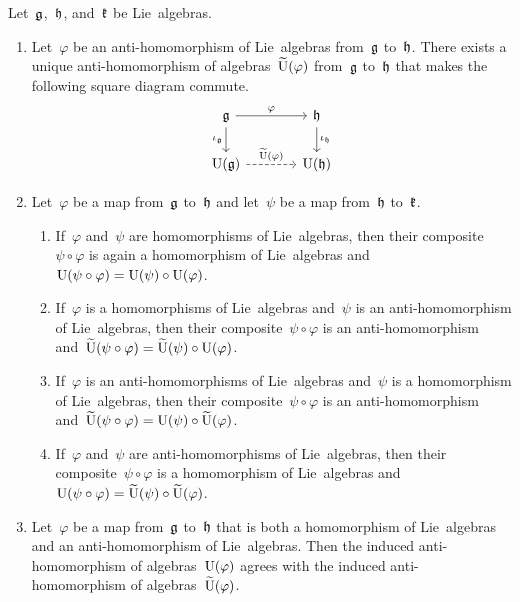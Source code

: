 \begin{proposition}
	\label{functoriality of universal enveloping algebra for anti-homomorphisms}
	Let~$\mathfrak{g}$,~$\mathfrak{h}$, and~$\mathfrak{k}$ be Lie~algebras.
	\begin{enumerate}
		\item
			Let~$\varphi$ be an anti-homomorphism of Lie~algebras from~$\mathfrak{g}$ to~$\mathfrak{h}$.
			There exists a unique anti-homomorphism of algebras~$\widetilde{\operatorname{U}}(\varphi)$ from~$\mathfrak{g}$ to~$\mathfrak{h}$ that makes the following square diagram commute.
			\[
				\begin{tikzcd}[column sep = large]
					\glie
					\arrow{r}[above]{\varphi}
					\arrow{d}[left]{\iota_{\glie}}
					&
					\hlie
					\arrow{d}[right]{\iota_{\hlie}}
					\\
					\Univ(\glie)
					\arrow[dashed]{r}[above]{\widetilde{\Univ}(\varphi)}
					&
					\Univ(\hlie)
				\end{tikzcd}
			\]
		\item
			Let~$\varphi$ be a map from~$\mathfrak{g}$ to~$\mathfrak{h}$ and let~$\psi$ be a map from~$\mathfrak{h}$ to~$\mathfrak{k}$.
			\begin{enumerate}
				\item
					If~$\varphi$ and~$\psi$ are homomorphisms of Lie~algebras, then their composite~$\psi \circ \varphi$ is again a homomorphism of Lie~algebras and~$\operatorname{U}(\psi \circ \varphi) = \operatorname{U}(\psi) \circ \operatorname{U}(\varphi)$.
				\item
					If~$\varphi$ is a homomorphisms of Lie~algebras and~$\psi$ is an anti-homomorphism of Lie~algebras, then their composite~$\psi \circ \varphi$ is an anti-homomorphism and~$\widetilde{\operatorname{U}}(\psi \circ \varphi) = \widetilde{\operatorname{U}}(\psi) \circ \operatorname{U}(\varphi)$.
				\item
					If~$\varphi$ is an anti-homomorphisms of Lie~algebras and~$\psi$ is a homomorphism of Lie~algebras, then their composite~$\psi \circ \varphi$ is an anti-homomorphism and~$\widetilde{\operatorname{U}}(\psi \circ \varphi) = \operatorname{U}(\psi) \circ \widetilde{\operatorname{U}}(\varphi)$.
				\item
				If~$\varphi$ and~$\psi$ are anti-homomorphisms of Lie~algebras, then their composite~$\psi \circ \varphi$ is a homomorphism of Lie~algebras and~$\operatorname{U}(\psi \circ \varphi) = \widetilde{\operatorname{U}}(\psi) \circ \widetilde{\operatorname{U}}(\varphi)$.
			\end{enumerate}
		\item
			\label{induced homomorphism same for homomorphisms and anti-homomorphisms}
			Let~$\varphi$ be a map from~$\mathfrak{g}$ to~$\mathfrak{h}$ that is both a homomorphism of Lie~algebras and an anti-homomorphism of Lie~algebras.
			Then the induced anti-homomorphism of algebras~$\operatorname{U}(\varphi)$ agrees with the induced anti-homomorphism of algebras~$\widetilde{\operatorname{U}}(\varphi)$.
	\end{enumerate}
\end{proposition}


